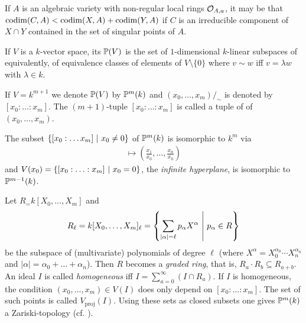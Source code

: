 \documentclass[a4paper,parskip=half,numbers=enddot, DIV=12]{scrreprt}
\begin{document}
	\begin{rem}
		If $A$ is an algebraic variety with non-regular local rings $\mathcal{O}_{A,a}$, it may be that $\operatorname{codim}(C,A) < \operatorname{codim}(X,A)+\operatorname{codim}(Y,A)$ if $C$ is an irreducible component of $X\cap Y$ contained in the set of singular points of $A$.
	\end{rem}
	\begin{defi}
		If $V$ is a $k$-vector space, its  $\mathbb{P}(V)$ is the set of $1$-dimensional $k$-linear subspaces of equivalently, of equivalence classes of elements of $V\setminus\{0\}$ where $v\sim w$ iff $v=\lambda w$ with $\lambda\in k$. 
		
		If $V = k^{m+1}$ we denote $\mathbb{P}(V)$ by $\mathbb{P}^m(k)$ and $(x_0,\ldots, x_m)/_\sim$ is denoted by $[x_0:\ldots:x_m]$. The $(m+1)$-tuple $[x_0:\ldots:x_m]$  is called a tuple of  of $(x_0,\ldots,x_m)$.
	\end{defi} 
	The subset $\left\{[x_0:\ldots x_m]\ \middle|\  x_0\neq 0 \right\}$ of $\mathbb{P}^m(k)$ is isomorphic to $k^m$ via 
	\begin{align*}
		[x_0:\ldots:x_n]\mapsto\left(\frac{x_1}{x_0},\ldots,\frac{x_n}{x_0}\right)
	\end{align*}
	and $V(x_0) = \left\{[x_0:\ldots:x_m]\ \middle|\  x_0=0\right\}$, the \emph{infinite hyperplane}, is isomorphic to $\mathbb{P}^{m-1}(k)$.
	
	Let $R_= k[X_0,\ldots, X_m]$ and 
	\begin{align*}
		R_\ell = k[X_0,\ldots, X_m]_\ell=\left\{\sum_{|\alpha| = \ell} p_\alpha X^\alpha\ \middle|\  p_\alpha\in R\right\}
	\end{align*}
	 be the subspace of (multivariate) polynomials of degree $\ell$ (where $X^\alpha=X_0^{\alpha_0}\cdots X_n^{\alpha_n}$ and $|\alpha|=\alpha_0+\ldots+\alpha_n$). Then $R$ becomes a \emph{graded ring}, that is, $R_a\cdot R_b \subseteq R_{a+b}$. An ideal $I$ is called \emph{homogeneous} iff $I = \sum_{a=0}^\infty (I\cap R_a)$. If $I$ is homogeneous, the condition $(x_0,\ldots,x_m)\in V(I)$ does only depend on $[x_0:\ldots:x_m]$. The set of such points is called $V_{\operatorname{proj}}(I)$. Using these sets as closed subsets one gives $\mathbb{P}^m(k)$ a Zariski-topology (cf. \cite[Section~2.2]{alg2}).
	
\end{document}
